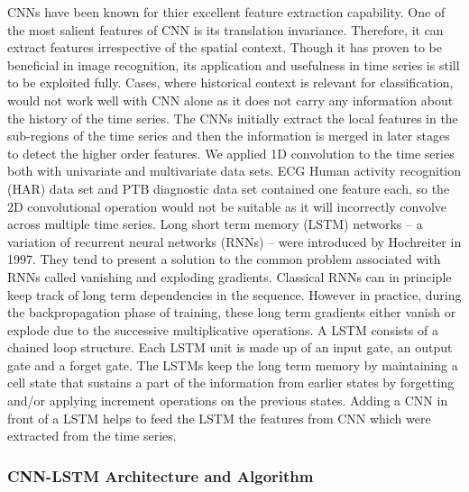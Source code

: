 \documentclass{ieeeaccess}
\begin{document}
CNNs have been known for thier excellent feature extraction capability. One of the most salient features of CNN is its translation invariance. Therefore, it can extract features irrespective of the spatial context. Though it has proven to be beneficial in image recognition, its application and usefulness in time series is still to be exploited fully. Cases, where historical context is relevant for classification, would not work well with CNN alone as it does not carry any information about the history of the time series. The CNNs initially extract the local features in the sub-regions of the time series and then the information is merged in later stages to detect the higher order features. We applied 1D convolution to the time series both with univariate and multivariate data sets. ECG Human activity recognition (HAR) data set and PTB diagnostic data set contained one feature each, so the 2D convolutional operation would not be suitable as it will incorrectly convolve across multiple time series. 
Long short term memory (LSTM) networks -- a variation of recurrent neural networks (RNNs) -- were introduced by Hochreiter \cite{LSTM} in 1997. They tend to present a solution to the common problem associated with RNNs called vanishing and exploding gradients. Classical RNNs can in principle keep track of long term dependencies in the sequence. However in practice, during the backpropagation phase of training, these long term gradients either vanish or explode due to the successive multiplicative operations. A LSTM consists of a chained loop structure. Each LSTM unit is made up of an input gate, an output gate and a forget gate. The LSTMs keep the long term memory by maintaining a cell state that sustains a part of the information from earlier states by forgetting and/or applying increment operations on the previous states. Adding a CNN in front of a LSTM helps to feed the LSTM the features from CNN which were extracted from the time series.
\subsubsection{CNN-LSTM Architecture and Algorithm}
\end{document}
